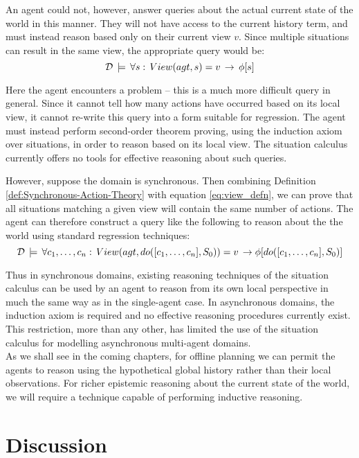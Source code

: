 An agent could not, however, answer queries about the actual current
state of the world in this manner. They will not have access to the
current history term, and must instead reason based only on their
current view $v$. Since multiple situations can result in the same
view, the appropriate query would be:\[
\mathcal{D}\,\models\,\forall s:\, View(agt,s)=v\,\rightarrow\,\phi[s]\]


Here the agent encounters a problem -- this is a much more difficult
query in general. Since it cannot tell how many actions have occurred
based on its local view, it cannot re-write this query into a form
suitable for regression. The agent must instead perform second-order
theorem proving, using the induction axiom over situations, in order
to reason based on its local view. The situation calculus currently
offers no tools for effective reasoning about such queries.

However, suppose the domain is synchronous. Then combining Definition
\ref{def:Synchronous-Action-Theory} with equation \eqref{eq:view_defn},
we can prove that all situations matching a given view will contain
the same number of actions. The agent can therefore construct a query
like the following to reason about the the world using standard regression
techniques:\[
\mathcal{D}\,\models\,\forall c_{1},\dots,c_{n}:\, View(agt,do([c_{1},\dots,c_{n}],S_{0}))=v\,\rightarrow\phi[do([c_{1},\dots,c_{n}],S_{0})]\]


Thus in synchronous domains, existing reasoning techniques of the
situation calculus can be used by an agent to reason from its own
local perspective in much the same way as in the single-agent case.
In asynchronous domains, the induction axiom is required and no effective
reasoning procedures currently exist. This restriction, more than
any other, has limited the use of the situation calculus for modelling
asynchronous multi-agent domains.\\


As we shall see in the coming chapters, for offline planning we can
permit the agents to reason using the hypothetical global history
rather than their local observations. For richer epistemic reasoning
about the current state of the world, we will require a technique
capable of performing inductive reasoning.


\section{Discussion\label{sec:Observations:Discussion}}

